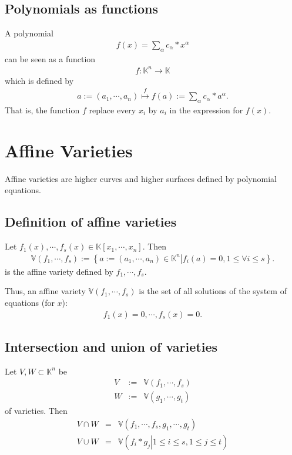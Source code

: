 \documentclass[11pt]{book}
\begin{document}
\subsection{Polynomials as functions}
A polynomial
\begin{eqnarray}
f(x) = \sum_\alpha c_\alpha * x^\alpha
\end{eqnarray}
can be seen as a function
\begin{eqnarray}
f : \mathbb{K}^n \to \mathbb{K}
\end{eqnarray}
which is defined by
\begin{eqnarray}
a:=(a_1, \cdots, a_n) \stackrel{f}{\mapsto} f(a) := \sum_\alpha c_\alpha * a^\alpha.
\end{eqnarray}
That is, the function $f$ replace every $x_i$ by $a_i$ in the expression for $f(x)$.

\section{Affine Varieties}
Affine varieties are higher curves and higher surfaces defined by polynomial equations.

\subsection{Definition of affine varieties}
\label{DefOfAV}
Let $f_1(x), \cdots, f_s(x) \in \mathbb{K}[x_1,\cdots,x_n]$.
Then
\begin{eqnarray}
\mathbb{V}(f_1, \cdots, f_s) := \left\{\left. a := (a_1, \cdots, a_n) \in \mathbb{K}^n \right| f_i(a) = 0, 1 \leq \forall i \leq s \right\}.
\end{eqnarray}
is the affine variety defined by $f_1, \cdots, f_s$.

Thus, an affine variety $\mathbb{V}(f_1, \cdots, f_s)$ is the set of all solutions of the system of equations (for $x$):
\begin{eqnarray}
f_1(x) =0, \cdots, f_s(x) =0.
\end{eqnarray}

\subsection{Intersection and union of varieties}
\label{intersectionAndUnionOfVarieties}
Let $V, W \subset \mathbb{K}^n$ be 
\begin{eqnarray}
V &:=& \mathbb{V}(f_1, \cdots, f_s)\\
W &:=& \mathbb{V}(g_1, \cdots, g_t)
\end{eqnarray}
of varieties.
Then
\begin{eqnarray}
V \cap W &=& \mathbb{V}(f_1, \cdots, f_s, g_1, \cdots, g_t) \\
V \cup W &=& \mathbb{V}\left( \left. f_i * g_j \right| 1 \leq i \leq s, 1 \leq j \leq t \right) 
\end{eqnarray}
\end{document}
